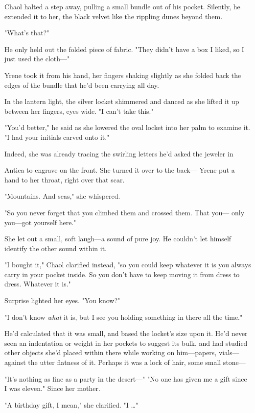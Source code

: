 Chaol halted a step away, pulling a small bundle out of his pocket. Silently, he extended it to her, the black velvet like the rippling dunes beyond them.

"What's that?"

He only held out the folded piece of fabric. "They didn't have a box I liked, so I just used the cloth---"

Yrene took it from his hand, her fingers shaking slightly as she folded back the edges of the bundle that he'd been carrying all day.

In the lantern light, the silver locket shimmered and danced as she lifted it up between her fingers, eyes wide. "I can't take this."

"You'd better," he said as she lowered the oval locket into her palm to examine it. "I had your initials carved onto it."

Indeed, she was already tracing the swirling letters he'd asked the jeweler in

Antica to engrave on the front. She turned it over to the back--- Yrene put a hand to her throat, right over that scar.

"Mountains. And seas," she whispered.

"So you never forget that you climbed them and crossed them. That you--- only you---got yourself here."

She let out a small, soft laugh---a sound of pure joy. He couldn't let himself identify the other sound within it.

"I bought it," Chaol clarified instead, "so you could keep whatever it is you always carry in your pocket inside. So you don't have to keep moving it from dress to dress. Whatever it is."

Surprise lighted her eyes. "You know?"

"I don't know \emph{what} it is, but I see you holding something in there all the time."

He'd calculated that it was small, and based the locket's size upon it. He'd never seen an indentation or weight in her pockets to suggest its bulk, and had studied other objects she'd placed within there while working on him---papers, vials---against the utter flatness of it. Perhaps it was a lock of hair, some small stone---

"It's nothing as fine as a party in the desert---" "No one has given me a gift since I was eleven." Since her mother.

"A birthday gift, I mean," she clarified. "I \ldots"

